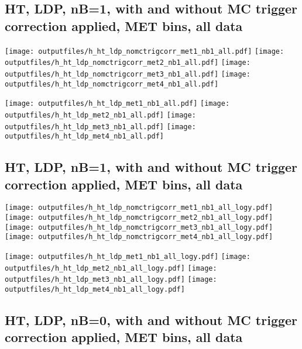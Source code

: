 \documentclass[11pt]{article}
\begin{document}
     \subsection{ HT, LDP, nB=1, with and without MC trigger correction applied, MET bins, all data}

    \noindent
     \texttt{[image: outputfiles/h\_ht\_ldp\_nomctrigcorr\_met1\_nb1\_all.pdf]}
     \texttt{[image: outputfiles/h\_ht\_ldp\_nomctrigcorr\_met2\_nb1\_all.pdf]}
     \texttt{[image: outputfiles/h\_ht\_ldp\_nomctrigcorr\_met3\_nb1\_all.pdf]}
     \texttt{[image: outputfiles/h\_ht\_ldp\_nomctrigcorr\_met4\_nb1\_all.pdf]}

    \noindent
     \texttt{[image: outputfiles/h\_ht\_ldp\_met1\_nb1\_all.pdf]}
     \texttt{[image: outputfiles/h\_ht\_ldp\_met2\_nb1\_all.pdf]}
     \texttt{[image: outputfiles/h\_ht\_ldp\_met3\_nb1\_all.pdf]}
     \texttt{[image: outputfiles/h\_ht\_ldp\_met4\_nb1\_all.pdf]}

   \clearpage
     \subsection{ HT, LDP, nB=1, with and without MC trigger correction applied, MET bins, all data}

    \noindent
     \texttt{[image: outputfiles/h\_ht\_ldp\_nomctrigcorr\_met1\_nb1\_all\_logy.pdf]}
     \texttt{[image: outputfiles/h\_ht\_ldp\_nomctrigcorr\_met2\_nb1\_all\_logy.pdf]}
     \texttt{[image: outputfiles/h\_ht\_ldp\_nomctrigcorr\_met3\_nb1\_all\_logy.pdf]}
     \texttt{[image: outputfiles/h\_ht\_ldp\_nomctrigcorr\_met4\_nb1\_all\_logy.pdf]}

    \noindent
     \texttt{[image: outputfiles/h\_ht\_ldp\_met1\_nb1\_all\_logy.pdf]}
     \texttt{[image: outputfiles/h\_ht\_ldp\_met2\_nb1\_all\_logy.pdf]}
     \texttt{[image: outputfiles/h\_ht\_ldp\_met3\_nb1\_all\_logy.pdf]}
     \texttt{[image: outputfiles/h\_ht\_ldp\_met4\_nb1\_all\_logy.pdf]}

   \clearpage
     \subsection{ HT, LDP, nB=0, with and without MC trigger correction applied, MET bins, all data}
\end{document}

